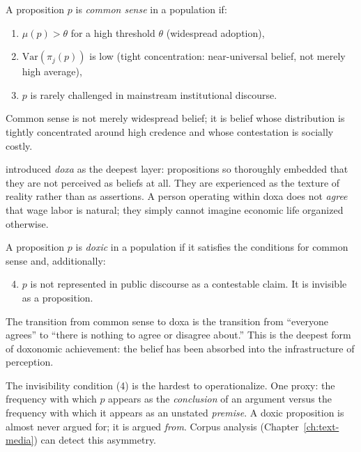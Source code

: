 \begin{definition}
\label{def:common-sense}
A proposition $p$ is \emph{common sense} in a population if:
\begin{enumerate}[nosep]
  \item $\mu(p) > \theta$ for a high threshold $\theta$ (widespread adoption),
  \item $\mathrm{Var}(\pi_j(p))$ is low (tight concentration: near-universal belief, not merely high average),
  \item $p$ is rarely challenged in mainstream institutional discourse.
\end{enumerate}
Common sense is not merely widespread belief; it is belief whose distribution is tightly concentrated around high credence and whose contestation is socially costly.
\end{definition}

\textcite{bourdieu1984} introduced \textit{doxa} as the deepest layer: propositions so thoroughly embedded that they are not perceived as beliefs at all.
They are experienced as the texture of reality rather than as assertions.
A person operating within doxa does not \emph{agree} that wage labor is natural; they simply cannot imagine economic life organized otherwise.

\begin{definition}[Doxa]
\label{def:doxa}
A proposition $p$ is \emph{doxic} in a population if it satisfies the conditions for common sense and, additionally:
\begin{enumerate}[nosep]
  \setcounter{enumi}{3}
  \item $p$ is not represented in public discourse as a contestable claim. It is invisible as a proposition.
\end{enumerate}
The transition from common sense to doxa is the transition from ``everyone agrees'' to ``there is nothing to agree or disagree about.''
This is the deepest form of doxonomic achievement: the belief has been absorbed into the infrastructure of perception.
\end{definition}

\begin{remark}
The invisibility condition (4) is the hardest to operationalize.
One proxy: the frequency with which $p$ appears as the \emph{conclusion} of an argument versus the frequency with which it appears as an unstated \emph{premise}.
A doxic proposition is almost never argued for; it is argued \emph{from}.
Corpus analysis (Chapter~\ref{ch:text-media}) can detect this asymmetry.
\end{remark}

